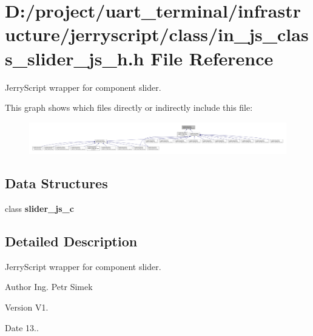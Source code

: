 \section{D\+:/project/uart\+\_\+terminal/infrastructure/jerryscript/class/in\+\_\+js\+\_\+class\+\_\+slider\+\_\+js\+\_\+h.h File Reference}
\label{in__js__class__slider__js__h_8h}


Jerry\+Script wrapper for component slider.  


This graph shows which files directly or indirectly include this file\+:
\nopagebreak
\begin{figure}[H]
\begin{center}
\leavevmode
\includegraphics[width=350pt]{in__js__class__slider__js__h_8h__dep__incl}
\end{center}
\end{figure}
\subsection*{Data Structures}
\begin{DoxyCompactItemize}
\item 
class \textbf{ slider\+\_\+js\+\_\+c}
\end{DoxyCompactItemize}


\subsection{Detailed Description}
Jerry\+Script wrapper for component slider. 

\begin{DoxyAuthor}{Author}
Ing. Petr Simek 
\end{DoxyAuthor}
\begin{DoxyVersion}{Version}
V1. 
\end{DoxyVersion}
\begin{DoxyDate}{Date}
13.. 
\end{DoxyDate}
